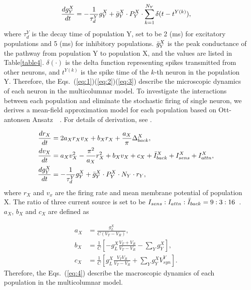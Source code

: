 \documentclass[10pt,letterpaper]{article}
\begin{document}
\begin{eqnarray}
\label{eq:3}
    \frac{dg_{Y}^{X}}{dt} = -\frac{1}{\tau_{d}^{Y}}g_{Y}^{X}+\Bar{g}_{Y}^{X}\cdot P_{Y}^{X}\cdot\sum_{k=1}^{N_{Y}}\delta(t-t^{Y(k)}),
\end{eqnarray}
where $\tau_{d}^{Y}$ is the decay time of population Y, set to be 2 (ms) for excitatory populations and 5 (ms) for inhibitory populations. $\Bar{g}_{Y}^{X}$ is the peak conductance of the pathway from population Y to population X, and the values are listed in Table\ref{table4}. $\delta(\cdot)$ is the delta function representing spikes transmitted from other neurons, and $t^{Y(k)}$ is the spike time of the $k$-th neuron in the population Y. Therefore, the Eqs.~(\ref{eq:1})(\ref{eq:2})(\ref{eq:3}) describe the microscopic dynamics of each neuron in the multicolumnar model. To investigate the interactions between each population and eliminate the stochastic firing of single neuron, we derives a mean-field approximation model for each population based on Ott-antonsen Ansatz~\cite{bib2}~\cite{bib3}. For details of derivation, see .

\begin{subequations}
\label{eq:4}
\begin{align}
    \frac{dr_{X}}{dt} &= 2a_{X}r_{X}v_{X} + b_{X}r_{X} + \frac{a_{X}}{\pi}\Delta_{back}^{X}, \label{eq:4a}\\
    \frac{dv_{X}}{dt} &= a_{X}v_{X}^{2} - \frac{\pi^{2}}{a_{X}}r_{X}^{2} + b_{X}v_{X} + c_{X} + \Bar{I}_{back}^{X} + I_{sens}^{X} + I_{attn}^{X},  \label{eq:4b}\\
    \frac{dg_{Y}^{X}}{dt} &= -\frac{1}{\tau_{d}^{Y}}g_{Y}^{X} + \Bar{g}_{Y}^{X}\cdot P_{Y}^{X}\cdot N_{Y}\cdot r_{Y}, \label{eq:4c}
\end{align}
\end{subequations}
where $r_{X}$ and $v_{x}$ are the firing rate and mean membrane potential of population X. The ratio of three current source is set to be $I_{sens}:I_{attn}:\Bar{I}_{back}=9:3:16$~\cite{bib1}. $a_{X}$, $b_{X}$ and $c_{X}$ are defined as

\begin{subequations}
\label{eq:5}
\begin{align}
    a_{X}& = \frac{g_{L}^{X}}{C(V_{T}-V_{R})}, \label{eq:5a}\\
    b_{X}& = \frac{1}{C} \left[ -g_{L}^{X}\frac{V_{T}+V_{R}}{V_{T}-V_{R}}-\sum_{Y}g_{Y}^{X} \right],  \label{eq:5b}\\
    c_{X}& = \frac{1}{C} \left[ g_{L}^{X}\frac{V_{T}V_{R}}{V_{T}-V_{R}}+\sum_{Y}g_{Y}^{X}V_{syn}^{Y} \right]. \label{eq:5c}
\end{align}
\end{subequations}
Therefore, the Eqs.~(\ref{eq:4}) describe the macroscopic dynamics of each population in the multicolumnar model.
\end{document}
